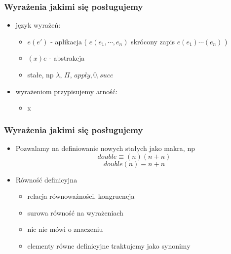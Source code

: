 \documentclass{beamer}
\begin{document}
\begin{frame}
\frametitle{Wyrażenia jakimi się posługujemy}

\begin{itemize}
\item język wyrażeń:
\begin{itemize}
\item $e(e')$ - aplikacja ( $e(e_1, \cdots, e_n)$ skrócony zapis $e(e_1)\cdots(e_n)$ )
\item $(x)e$ - abstrakcja
\item stałe, np $\lambda$, $\Pi$, $apply, 0, succ$
\end{itemize}

\item wyrażeniom przypisujemy arność:
\begin{itemize}
\item x
\end{itemize}

\end{itemize}

\end{frame}


\begin{frame}
\frametitle{Wyrażenia jakimi się posługujemy}

\begin{itemize}

\item Pozwalamy na definiowanie nowych stałych jako makra, np
\[
 double \equiv (n)(n + n)
\]
\[
 double(n) \equiv n + n
\]


\item Równość definicyjna
\begin{itemize}
 \item relacja równoważności, kongruencja
 \item surowa równość na wyrażeniach
 \item nic nie mówi o znaczeniu
 \item elementy równe definicyjne traktujemy jako synonimy
\end{itemize}

\end{itemize}

\end{frame}

\end{document}
